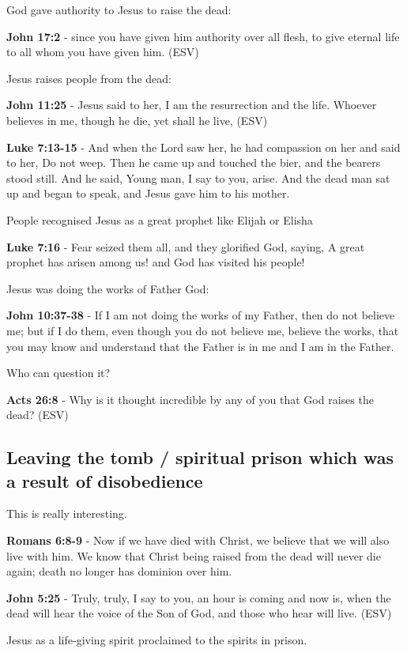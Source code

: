 \documentclass[11pt]{article}
\begin{document}
God gave authority to Jesus to raise the dead:

\textbf{John 17:2} - since you have given him authority over all flesh, to give eternal life to all whom you have given him. (ESV)

Jesus raises people from the dead:

\textbf{John 11:25} - Jesus said to her, I am the resurrection and the life. Whoever believes in me, though he die, yet shall he live, (ESV)

\textbf{Luke 7:13-15} - And when the Lord saw her, he had compassion on her and said to her, Do not weep. Then he came up and touched the bier, and the bearers stood still. And he said, Young man, I say to you, arise. And the dead man sat up and began to speak, and Jesus gave him to his mother.

People recognised Jesus as a great prophet like Elijah or Elisha

\textbf{Luke 7:16} - Fear seized them all, and they glorified God, saying, A great prophet has arisen among us! and God has visited his people!

Jesus was doing the works of Father God:

\textbf{John 10:37-38} - If I am not doing the works of my Father, then do not believe me; but if I do them, even though you do not believe me, believe the works, that you may know and understand that the Father is in me and I am in the Father.

Who can question it?

\textbf{Acts 26:8} -  Why is it thought incredible by any of you that God raises the dead?  (ESV)

\subsection{Leaving the tomb / spiritual prison which was a result of disobedience}
\label{sec:org939d4ac}
This is really interesting.

\textbf{Romans 6:8-9} - Now if we have died with Christ, we believe that we will also live with him. We know that Christ being raised from the dead will never die again; death no longer has dominion over him.

\textbf{John 5:25} - Truly, truly, I say to you, an hour is coming and now is, when the dead will hear the voice of the Son of God, and those who hear will live. (ESV)

Jesus as a life-giving spirit proclaimed to the spirits in prison.
\end{document}
